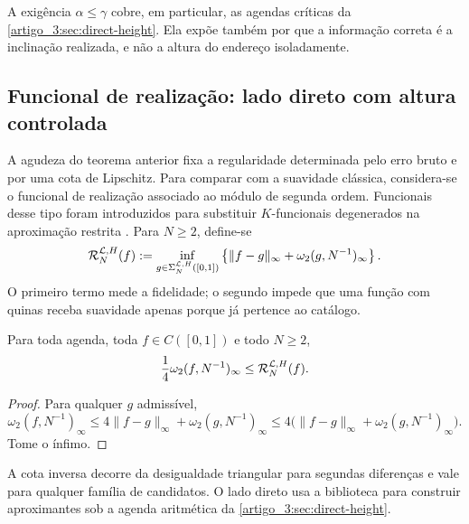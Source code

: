 A exigência $\alpha\le\gamma$ cobre, em particular, as agendas críticas da
\cref{artigo_3:sec:direct-height}. Ela expõe também por que a informação correta é a inclinação
realizada, e não a altura do endereço isoladamente.

\subsection{Funcional de realização: lado direto com altura controlada}

A agudeza do teorema anterior fixa a regularidade determinada pelo erro bruto
e por uma cota de Lipschitz. Para comparar com a suavidade clássica, considera-se
o funcional de realização associado ao módulo de segunda ordem. Funcionais
desse tipo foram introduzidos para substituir $K$-funcionais degenerados na
aproximação restrita \citep{artigo_2-hristovivanov1990}. Para $N\ge2$, define-se
\begin{equation}
 \mathcal R_N^{\mathcal{L},H}(f)
 :=\inf_{g\in\Sigma_N^{\mathcal{L},H}([0,1])}
 \left\{\|f-g\|_\infty+
 \omega_2(g,N^{-1})_\infty\right\}.
 \label{artigo_3:eq:self-roughness-certificate}
\end{equation}
O primeiro termo mede a fidelidade; o segundo impede que uma função com quinas
receba suavidade apenas porque já pertence ao catálogo.

\begin{lemma}\label{map:artigo_3:5.10}
\label{artigo_3:lem:universal-regularized-inverse}
Para toda agenda, toda $f\in C([0,1])$ e todo $N\ge2$,
\begin{equation}
 \frac14\omega_2(f,N^{-1})_\infty
 \le \mathcal R_N^{\mathcal{L},H}(f).
 \label{artigo_3:eq:universal-regularized-lower}
\end{equation}
\end{lemma}

\begin{proof}
Para qualquer $g$ admissível,
\[
 \omega_2(f,N^{-1})_\infty
 \le4\|f-g\|_\infty+\omega_2(g,N^{-1})_\infty
 \le4\bigl(\|f-g\|_\infty+\omega_2(g,N^{-1})_\infty\bigr).
\]
Tome o ínfimo.
\end{proof}

\begin{remark}\label{map:artigo_3:5.11}
\label{artigo_3:rem:realization-functional-scope}
A cota inversa decorre da desigualdade triangular para segundas diferenças e vale para qualquer família de candidatos. O lado direto usa a biblioteca para construir aproximantes sob a agenda aritmética da \cref{artigo_3:sec:direct-height}.
\end{remark}

